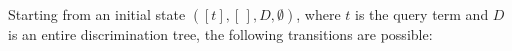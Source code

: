 

Starting from an initial state $([t], [\,], D, \emptyset)$, where $t$ is the query
term and $D$ is an entire discrimination tree, the following transitions are
possible:
  
  
  

